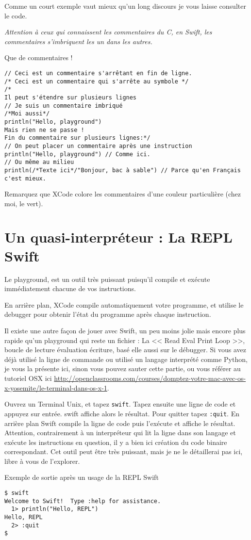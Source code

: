 Comme un court exemple vaut mieux qu’un long discours je vous laisse consulter le code.

\emph{Attention à ceux qui connaissent les commentaires du C, en Swift, les commentaires
s'imbriquent les un dans les autres.}

\begin{listing}[h]
\caption{Que de commentaires !}
\begin{verbatim}
// Ceci est un commentaire s'arrêtant en fin de ligne.
/* Ceci est un commentaire qui s'arrête au symbole */
/*
Il peut s'étendre sur plusieurs lignes
// Je suis un commentaire imbriqué
/*Moi aussi*/
println("Hello, playground")
Mais rien ne se passe !
Fin du commentaire sur plusieurs lignes:*/
// On peut placer un commentaire après une instruction
println("Hello, playground") // Comme ici.
// Ou même au milieu
println(/*Texte ici*/"Bonjour, bac à sable") // Parce qu'en Français c'est mieux.
\end{verbatim}
\end{listing}
Remarquez que XCode colore les commentaires d'une couleur particulière (chez moi, le vert).
\section{Un quasi-interpréteur : La REPL Swift}
Le playground, est un outil très puissant puisqu’il compile et exécute immédiatement
chacune de vos instructions.

En arrière plan, XCode compile automatiquement votre programme, et utilise le debugger
pour obtenir l’état du programme après chaque instruction.

Il existe une autre façon de jouer avec Swift, un peu moins jolie mais encore plus rapide
qu’un playground qui reste un fichier : La << Read Eval Print Loop >>, boucle de lecture évaluation écriture, basé elle aussi sur le
débugger. Si vous avez déjà utilisé la ligne de commande ou utilisé un langage interprété
comme Python, je vous la présente ici, sinon vous pouvez sauter cette partie, ou vous
référer au tutoriel OSX ici \url{http://openclassrooms.com/courses/domptez-votre-mac-avec-os-x-yosemite/le-terminal-dans-os-x-1}.

Ouvrez un Terminal Unix, et tapez \verb"swift".
Tapez ensuite une ligne de code et appuyez sur entrée.
swift affiche alors le résultat.
Pour quitter tapez \verb":quit".
En arrière plan Swift compile la ligne de code puis l'exécute et affiche le résultat.
Attention, contrairement à un interpréteur qui lit la ligne dans son langage et exécute
les instructions en question, il y a bien ici création du code binaire correspondant.
Cet outil peut être très puissant, mais je ne le détaillerai pas ici, libre à vous de l’explorer.
\begin{listing}[h]
\caption{Exemple de sortie après un usage de la REPL Swift}
\begin{verbatim}
$ swift
Welcome to Swift!  Type :help for assistance.
  1> println("Hello, REPL")
Hello, REPL
  2> :quit
$
\end{verbatim}
\end{listing}